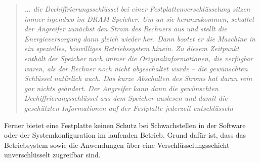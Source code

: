 \begin{quotation}\em
... die Dechiffrierungsschlüssel bei einer Festplattenverschlüsselung sitzen immer irgendwo im DRAM-Speicher. Um an sie heranzukommen, schaltet der Angreifer zunächst den Strom des Rechners aus und stellt die Energieversorgung dann gleich wieder her. Dann bootet er die Maschine in ein spezielles, böswilliges Betriebssystem hinein. Zu diesem Zeitpunkt enthält der Speicher noch immer die Originalinformationen, die verfügbar waren, als der Rechner noch nicht abgeschaltet wurde – die gewünschten Schlüssel natürlich auch. Das kurze Abschalten des Stroms hat daran rein gar nichts geändert. Der Angreifer kann dann die gewünschten Dechiffrierungsschlüssel aus dem Speicher auslesen und damit die geschützten Informationen auf der Festplatte jederzeit entschlüsseln\end{quotation}\cite{Schwan2008}

Ferner bietet eine Festplatte keinen Schutz bei Schwachstellen in der Software oder der Systemkonfiguration im laufenden Betrieb. Grund dafür ist, dass das Betriebsystem sowie die Anwendungen über eine Verschlüsselungsschicht unverschlüsselt zugreifbar sind.

